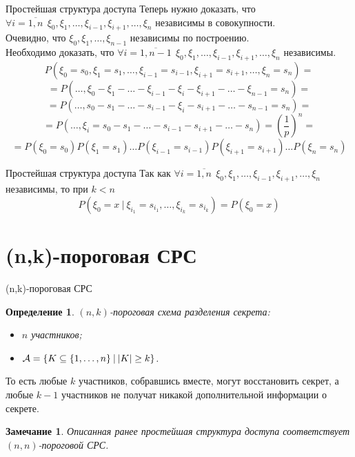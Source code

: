 \documentclass{beamer}
\newtheorem{define}{Определение}
\newtheorem{Note}{Замечание}
\begin{document}
\begin{frame}{Простейшая структура доступа}
Теперь нужно доказать, что \(\forall i = \overline{1, n} \ \ \xi_0, \xi_1, \dots, \xi_{i - 1}, \xi_{i + 1}, \dots, \xi_n\) независимы в совокупности. \\
Очевидно, что \(\xi_0, \xi_1, \dots, \xi_{n - 1}\) независимы по построению. \\
Необходимо доказать, что \(\forall i = \overline{1, n - 1} \ \ \xi_0, \xi_1, \dots, \xi_{i - 1}, \xi_{i + 1}, \dots, \xi_n\) независимы.
    \[
    P(\xi_0 = s_0, \xi_1 = s_1, \dots, \xi_{i - 1} = s_{i - 1}, \xi_{i + 1} = s_{i + 1}, \dots, \xi_n = s_n) = 
    \]
    \[
    = P(\dots, \xi_0 - \xi_1 - \dots - \xi_{i - 1} - \xi_i - \xi_{i + 1} - \dots - \xi_{n - 1} = s_n) = 
    \]
    \[
    = P(\dots, s_0 - s_1 - \dots - s_{i - 1} - \xi_i - s_{i + 1} - \dots - s_{n - 1} = s_n) = 
    \]
    \[
    = P(\dots, \xi_i = s_0 - s_1 - \dots - s_{i - 1} - s_{i + 1} - \dots - s_n) = \left(\frac{1}{p}\right)^{n} = 
    \]
    \[
    = P(\xi_0 = s_0) P(\xi_1 = s_1) \dots P(\xi_{i - 1} = s_{i - 1}) P(\xi_{i + 1} = s_{i + 1}) \dots  P(\xi_{n} = s_{n}) 
    \]
    
\end{frame}

\begin{frame}{Простейшая структура доступа}
Так как \(\forall i = \overline{1, n} \ \ \xi_0, \xi_1, \dots, \xi_{i - 1}, \xi_{i + 1}, \dots, \xi_n\) независимы, то при \(k < n\)
    \[
    P(\xi_0 = x \ | \ \xi_{i_1} = s_{i_1}, \dots, \xi_{i_k} = s_{i_k}) = P(\xi_0 = x)
    \]
\end{frame}

\section{(n,k)-пороговая СРС}
\begin{frame}{(n,k)-пороговая СРС}
    \begin{define}
        \( (n, k) \)-пороговая схема разделения секрета:
        \begin{itemize}
            \item \(n\) участников;
            \item \(\mathcal{A} = \{ K \subseteq \{1, \dots, n\} \ \vline \ |K| \geq k \}\).
        \end{itemize}
    \end{define}
    То есть любые \(k\) участников, собравшись вместе, могут восстановить секрет, а любые \(k - 1\) участников не получат никакой дополнительной информации о секрете. \\
    \begin{Note}
        Описанная ранее простейшая структура доступа соответствует \((n, n)\)-пороговой СРС.
    \end{Note}
\end{frame}
\end{document}

